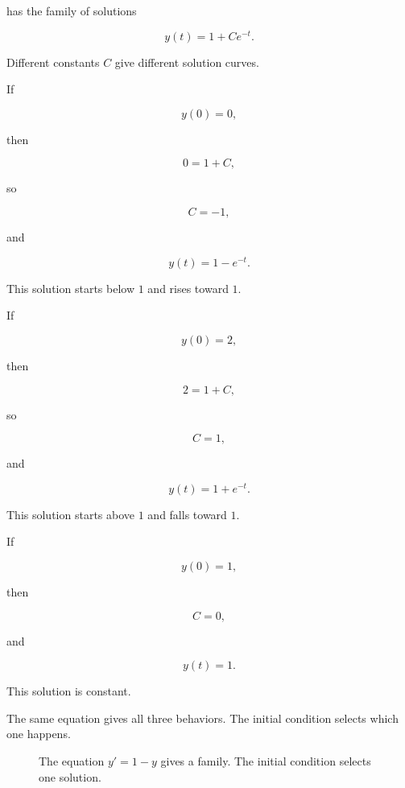 has the family of solutions

\[
\boxed{
y(t)=1+Ce^{-t}.
}
\]

Different constants \(C\) give different solution curves.

If

\[
y(0)=0,
\]

then

\[
0=1+C,
\]

so

\[
C=-1,
\]

and

\[
\boxed{
y(t)=1-e^{-t}.
}
\]

This solution starts below \(1\) and rises toward \(1\).

If

\[
y(0)=2,
\]

then

\[
2=1+C,
\]

so

\[
C=1,
\]

and

\[
\boxed{
y(t)=1+e^{-t}.
}
\]

This solution starts above \(1\) and falls toward \(1\).

If

\[
y(0)=1,
\]

then

\[
C=0,
\]

and

\[
\boxed{
y(t)=1.
}
\]

This solution is constant.

The same equation gives all three behaviors.  The initial condition selects which one
happens.

\begin{figure}[h]
\centering
{}
\caption{The equation \(y'=1-y\) gives a family.  The initial condition selects one solution.}
\label{fig:same-de-different-initial-conditions}
\end{figure}


